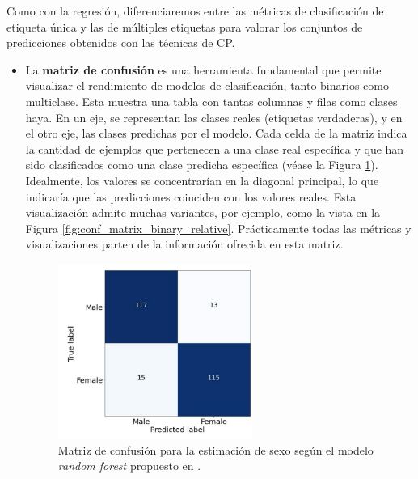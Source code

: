Como con la regresión, diferenciaremos entre las métricas de clasificación de etiqueta única y las de
múltiples etiquetas para valorar los conjuntos de predicciones obtenidos con las técnicas de CP.

\begin{itemize}

    \item La \textbf{matriz de confusión} es una herramienta fundamental que permite visualizar el rendimiento 
    de modelos de clasificación, tanto binarios como multiclase. Esta muestra una tabla con tantas columnas y 
    filas como clases haya. En un eje, se representan las clases reales (etiquetas verdaderas), y en el otro 
    eje, las clases predichas por el modelo. Cada celda de la matriz indica la cantidad de ejemplos que 
    pertenecen a una clase real específica y que han sido clasificados como una clase predicha específica 
    (véase la Figura \ref{fig:conf_matrix_binary}).
    Idealmente, los valores se concentrarían en la diagonal principal, lo que indicaría que las predicciones 
    coinciden con los valores reales.
    Esta visualización admite muchas variantes, por ejemplo, como la vista en la Figura 
    \ref{fig:conf_matrix_binary_relative}.
    Prácticamente todas las métricas y visualizaciones parten de la información ofrecida en esta matriz. 

    \begin{figure}[h]
        \centering
        \includegraphics[width=0.6\textwidth]{capitulos/cap_02/imagenes/confusion_matrix_binary.png}
        \caption{
            Matriz de confusión para la estimación de sexo según el modelo \textit{random forest} 
            propuesto en \cite{bidmos2023}.
        } 
        \label{fig:conf_matrix_binary}
    \end{figure}
    
    \begin{figure}[h]
        \centering
    

\end{figure}
\end{itemize}
